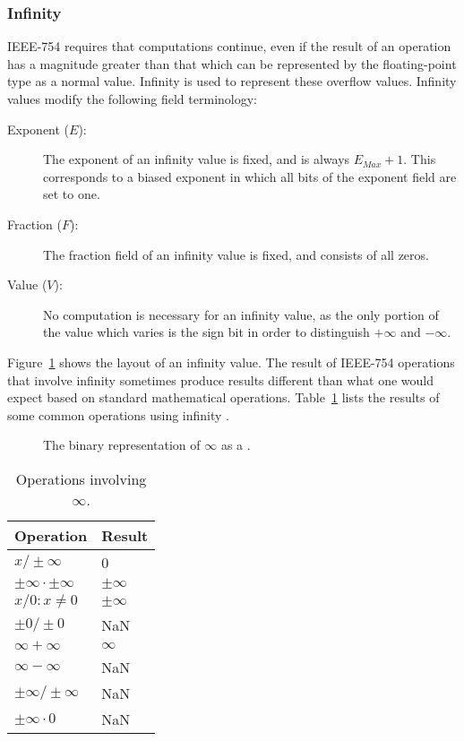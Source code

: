 \subsubsection{Infinity}
\label{subsubsec:infinity}
IEEE-754 requires that computations continue, even if the result of an operation has a magnitude greater than that which can be represented by the floating-point type as a normal value. Infinity is used to represent these overflow values. Infinity values modify the following field terminology:

\begin{description}
	\item[Exponent ($E$):]
		The exponent of an infinity value is fixed, and is always $E_{Max} + 1$. This corresponds to a biased exponent in which all bits of the exponent field are set to one.
	\item[Fraction ($F$):]
		The fraction field of an infinity value is fixed, and consists of all zeros.
	\item[Value ($V$):]
		No computation is necessary for an infinity value, as the only portion of the value which varies is the sign bit in order to distinguish $+\infty$ and $-\infty$.
\end{description}

Figure~\ref{figure:infinity} shows the layout of an infinity value. The result of IEEE-754 operations that involve infinity sometimes produce results different than what one would expect based on standard mathematical operations. Table~\ref{table:infinity_ops} lists the results of some common operations using infinity \cite{Obiltschnig:06}.

\begin{figure}
	\centering
  \caption{The binary representation of $\infty$ as a .}
  \label{figure:infinity}
\end{figure}

\begin{table}
	\centering
 	\caption{Operations involving $\infty$.}
  \label{table:infinity_ops}
	\begin{tabular}{|l|l|}
		\hline
		\textbf{Operation}          & \textbf{Result}  \\
		\hline
		$x / \pm\infty$             & 0                \\
		\hline
		$\pm\infty \cdot \pm\infty$ & $\pm\infty$      \\
		\hline
		$x / 0 : x \neq 0$          & $\pm\infty$      \\
		\hline
		$\pm 0 / \pm 0$             & NaN              \\
		\hline
		$\infty + \infty$           & $\infty$         \\
		\hline
		$\infty - \infty$           & NaN              \\
		\hline
		$\pm \infty / \pm \infty$   & NaN              \\
		\hline
		$\pm \infty \cdot 0$        & NaN              \\
		\hline
	\end{tabular}
\end{table}

